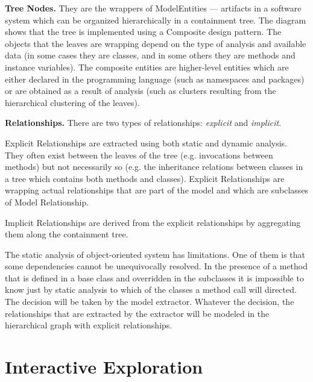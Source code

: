 \documentclass[preprint,12pt]{elsarticle}
\begin{document}
\begin{description}

\item {\bf Tree Nodes.} They are the wrappers of ModelEntities --- artifacts in a software system which can be organized hierarchically in a containment tree. The diagram shows that the tree is implemented using a Composite design pattern. The objects that the leaves are wrapping depend on the type of analysis and available data (in some cases they are classes, and in some others they are methods and instance variables). The composite entities are higher-level entities which are either declared in the programming language (such as namespaces and packages) or are obtained as a result of analysis (such as clusters resulting from the hierarchical clustering of the leaves).

\item {\bf Relationships.} There are two types of relationships: {\em explicit} and {\em implicit}.

Explicit Relationships are extracted using both static and dynamic analysis. They often exist between the leaves of the tree (e.g. invocations between methods) but not necessarily so (e.g. the inheritance relations between classes in a tree which contains both methods and classes). Explicit Relationships are wrapping actual relationships that are part of the model and which are subclasses of Model Relationship.

Implicit Relationships are derived from the explicit relationships by aggregating them along the containment tree. 

\end{description}

The static analysis of object-oriented system has limitations. One of them is that some dependencies cannot be unequivocally resolved. In the presence of a method that is defined in a base class and overridden in the subclasses it is impossible to know just by static analysis to which of the classes a method call will directed. The decision will be taken by the model extractor. Whatever the decision, the relationships that are extracted by the extractor will be modeled in the hierarchical graph with explicit relationships.

\section {Interactive Exploration} \label {sec:interact}
\end{document}
